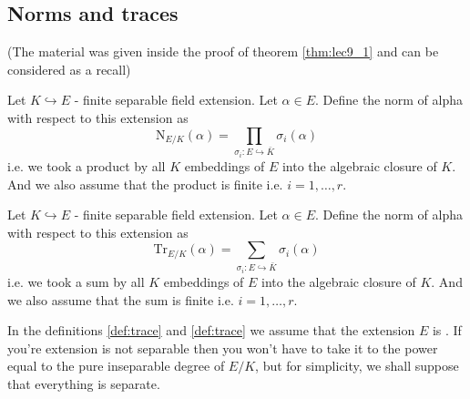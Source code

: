 \subsection{Norms and traces}
(The material was given inside the proof of theorem \ref{thm:lec9_1}
and can be considered as a recall)
\begin{definition}[Norm]
  Let $K \hookrightarrow E$ - finite separable field extension. Let $\alpha \in
  E$.   Define the norm of alpha with respect to this extension as
  \[
  \mathrm {N}_{E/K}\left(\alpha\right) =
  \prod_{\sigma_i: E \hookrightarrow \bar{K}} \sigma_i\left(\alpha\right)
  \]
  i.e. we took a product by all $K$ embeddings of $E$ into the
  algebraic closure of $K$. And we also assume that the product is
  finite i.e. $i = 1, \dots, r$.
  \label{def:norm}
\end{definition}

\begin{definition}[Trace]
  Let $K \hookrightarrow E$ - finite separable field extension. Let $\alpha \in
  E$.   Define the norm of alpha with respect to this extension as
  \[
  \mathrm {Tr}_{E/K}\left(\alpha\right) =
  \sum_{\sigma_i: E \hookrightarrow \bar{K}} \sigma_i\left(\alpha\right)
  \]
  i.e. we took a sum by all $K$ embeddings of $E$ into the
  algebraic closure of $K$. And we also assume that the sum is
  finite i.e. $i = 1, \dots, r$.
  \label{def:trace}
\end{definition}

In the definitions \ref{def:trace} and \ref{def:trace} we assume that
the extension $E$ is . If you're
extension is not separable then you won't have to take it to the power
equal to the pure inseparable degree of $E/K$, but for simplicity,
we shall suppose that everything is separate.

